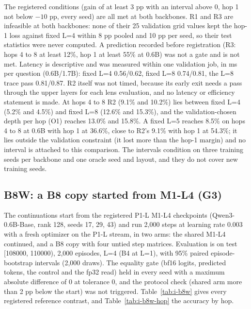 The registered conditions (gain of at least 3 pp with an interval above 0, hop 1 not below $-10$ pp, every seed) are all met at both backbones.  %
R1 and R3 are infeasible at both backbones: none of their 25 validation grid values kept the hop-1 loss against fixed L=4 within 8 pp pooled and 10 pp per seed, so their test statistics were never computed.  %
A prediction recorded before registration (R3: hops 4 to 8 at least 12\%, hop 1 at least 55\% at 0.6B) was not a gate and is not met.  %
Latency is descriptive and was measured within one validation job, in ms per question (0.6B/1.7B): fixed L=4 0.56/0.62, fixed L=8 0.74/0.81, the L=8 trace pass 0.81/0.87.
R2 itself was not timed, because its early exit needs a pass through the upper layers for each lens evaluation, and no latency or efficiency statement is made.  %
At hops 4 to 8 R2 (9.1\% and 10.2\%) lies between fixed L=4 (5.2\% and 4.5\%) and fixed L=8 (12.6\% and 15.3\%), and the validation-chosen depth per hop (O1) reaches 13.0\% and 15.8\%.  %
A fixed L=5 reaches 8.5\% on hops 4 to 8 at 0.6B with hop 1 at 36.6\%, close to R2's 9.1\% with hop 1 at 54.3\%; it lies outside the validation constraint (it lost more than the hop-1 margin) and no interval is attached to this comparison.  %
The intervals condition on three training seeds per backbone and one oracle seed and layout, and they do not cover new training seeds.

\subsection{B8W: a B8 copy started from M1-L4 (G3)}

The continuations start from the registered P1-L M1-L4 checkpoints (Qwen3-0.6B-Base, rank 128, seeds 17, 29, 43) and run 2,000 steps at learning rate 0.003 with a fresh optimizer on the P1-L stream, in two arms: the shared M1-L4 continued, and a B8 copy with four untied step matrices.
Evaluation is on test [108000, 110000), 2,000 episodes, L=4 (B4 at L=1), with 95\% paired episode-bootstrap intervals (2,000 draws).
The equality gate (bf16 logits, predicted tokens, the control and the fp32 read) held in every seed with a maximum absolute difference of 0 at tolerance 0, and the protocol check (shared arm more than 2 pp below the start) was not triggered.  %
Table~\ref{tab:i-b8w} gives every registered reference contrast, and Table~\ref{tab:i-b8w-hop} the accuracy by hop.

